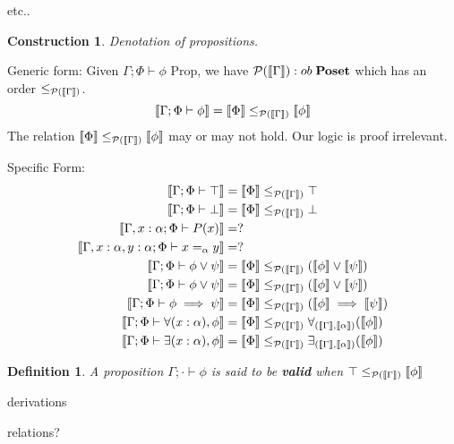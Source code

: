\documentclass{article}
\newtheorem{definition}[deff]{Definition}
\newtheorem*{construction}{Construction}
\begin{document}
\begin{prooftree}
\end{prooftree}
etc..

\begin{construction}
    Denotation of propositions.
\end{construction}
Generic form: Given $\Gamma ; \Phi \vdash \phi \textrm{ Prop}$,
we have $\mathcal{P}(\den{\Gamma}) : ob \; \bf{Poset}$ 
which has an order $\leq_{\mathcal{P}(\den{\Gamma})}$.
\[
  \den{\Gamma ; \Phi \vdash \phi } = \den{\Phi} \leq _{\mathcal{P}(\den{\Gamma})} \den{\phi}  
\]
The relation $\den{\Phi} \leq _{\mathcal{P}(\den{\Gamma})} \den{\phi}$ may or may not hold. 
Our logic is proof irrelevant.

Specific Form:
\begin{align*}
    \den{\Gamma ; \Phi \vdash \top} &= \den{\Phi} \leq_{\mathcal{P}(\den{\Gamma})} \top \\
    \den{\Gamma ; \Phi \vdash \bot} &= \den{\Phi} \leq_{\mathcal{P}(\den{\Gamma})} \bot \\
    \den{\Gamma, x : \alpha ; \Phi \vdash P(x)} &= ? \\
    \den{\Gamma, x : \alpha , y : \alpha ; \Phi \vdash x =_{\alpha} y} &= ? \\
    \den{\Gamma ; \Phi \vdash \phi \lor \psi } &= \den{\Phi} \leq_{\mathcal{P}(\den{\Gamma})} (\den{\phi} \lor \den{\psi}) \\
    \den{\Gamma ; \Phi \vdash \phi \lor \psi } &= \den{\Phi} \leq_{\mathcal{P}(\den{\Gamma})} (\den{\phi} \lor \den{\psi}) \\
    \den{\Gamma ; \Phi \vdash \phi \implies \psi } &= \den{\Phi} \leq_{\mathcal{P}(\den{\Gamma})} (\den{\phi} \implies \den{\psi}) \\
    \den{\Gamma ; \Phi \vdash \forall(x : \alpha), \phi } &= \den{\Phi} \leq_{\mathcal{P}(\den{\Gamma})} \forall_{(\den{\Gamma}, \den{\alpha})}(\den{\phi}) \\
    \den{\Gamma ; \Phi \vdash \exists(x : \alpha), \phi } &= \den{\Phi} \leq_{\mathcal{P}(\den{\Gamma})} \exists_{(\den{\Gamma}, \den{\alpha})}(\den{\phi})
\end{align*}

\begin{definition}
    A proposition $\Gamma ; \cdot \vdash \phi$ is said to be \textbf{valid} when $\top \leq_{\mathcal{P}(\den{\Gamma})} \den{\phi}$
\end{definition}

derivations

relations?



\end{document}
